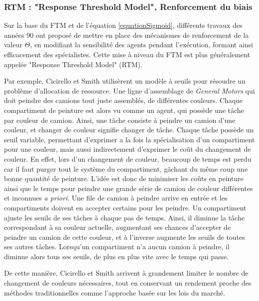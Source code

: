         \subsubsection{RTM : "Response Threshold Model", Renforcement du biais}
        Sur la base du FTM et de l'équation \ref{equationSigmoid}, différents travaux des années 90 \cite{theraulaz_response_1998,carbonell_multi-agent_1994} ont proposé de mettre en place des mécanismes de renforcement de la valeur $\Theta$, en modifiant la sensibilité des agents pendant l'exécution, formant ainsi efficacement des spécialistes. Cette mise à niveau du FTM est plus généralement appelée "Response Threshold Model" (RTM).
        
        Par exemple, Cicirello et Smith \cite{cicirello_wasp-like_2004} utilisèrent un modèle à seuils pour résoudre un problème d'allocation de ressource. Une ligne d'assemblage de \textit{General Motors} qui doit peindre des camions tout juste assemblés, de différentes couleurs. Chaque compartiment de peinture est alors vu comme un agent, qui possède une tâche par couleur de camion. Ainsi, une tâche consiste à peindre un camion d'une couleur, et changer de couleur signifie changer de tâche. Chaque tâche possède un seuil variable, permettant d'exprimer a la fois la spécialisation d'un compartiment pour une couleur, mais aussi indirectement d'exprimer le coût du changement de couleur. En effet, lors d'un changement de couleur, beaucoup de temps est perdu car il faut purger tout le système du compartiment, gâchant du même coup une bonne quantité de peinture. L'idée est donc de minimiser les coûts en peinture ainsi que le temps pour peindre une grande série de camion de couleur différentes et inconnues \textit{a priori}. Une file de camion à peindre arrive en entrée et les compartiments doivent en accepter certains pour les peindre. Un compartiment ajuste les seuils de ses tâches à chaque pas de temps. Ainsi, il diminue la tâche correspondant à sa couleur actuelle, augmentant ses chances d'accepter de peindre un camion de cette couleur, et à l'inverse augmente les seuils de toutes ses autres tâches. Lorsqu'un compartiment n'a aucun camion à peindre, il diminue alors tous ses seuils, de plus en plus vite avec le temps qui passe.
        
        De cette manière, Cicirello et Smith arrivent à grandement limiter le nombre de changement de couleurs nécessaires, tout en conservant un rendement proche des méthodes traditionnelles comme l'approche basée sur les lois du marché.
        
